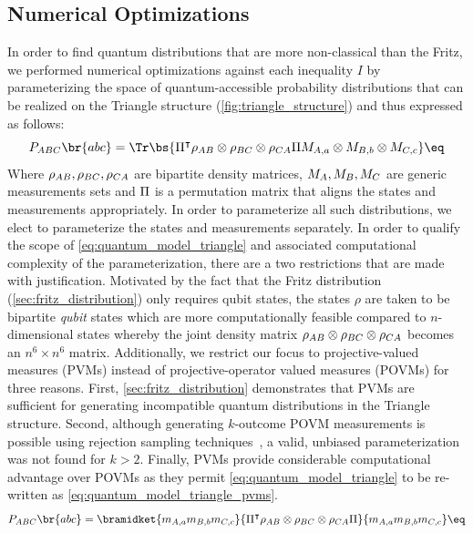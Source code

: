 \documentclass[aps, 10pt, english, twoside, pra, nofootinbib, tightenlines, longbibliography, superscriptaddress]{revtex4-1}
\begin{document}
    \subsection{Numerical Optimizations}
    \label{sec:optimizations}

    In order to find quantum distributions that are more non-classical than the Fritz, we performed numerical optimizations against each inequality $I$ by parameterizing the space of quantum-accessible probability distributions that can be realized on the Triangle structure (\cref{fig:triangle_structure}) and thus expressed as follows:
    \[ \prob[\p{ABC}]\br{abc} = \Tr\bs{\netperm^\intercal \rho_{\p{AB}}\otimes\rho_{\p{BC}}\otimes\rho_{\p{CA}} \netperm M_{\p{A},a}\otimes M_{\p{B},b} \otimes M_{\p{C},c}} \eq \label{eq:quantum_model_triangle}\]
    Where $\rho_{AB}, \rho_{BC}, \rho_{CA}$ are bipartite density matrices, $M_{A}, M_{B}, M_{C}$ are generic measurements sets and $\Pi$ is a permutation matrix that aligns the states and measurements appropriately. In order to parameterize all such distributions, we elect to parameterize the states and measurements separately. In order to qualify the scope of \cref{eq:quantum_model_triangle} and associated computational complexity of the parameterization, there are a two restrictions that are made with justification. Motivated by the fact that the Fritz distribution (\cref{sec:fritz_distribution}) only requires qubit states, the states $\rho$ are taken to be bipartite \textit{qubit} states which are more computationally feasible compared to $n$-dimensional states whereby the joint density matrix $\rho_{AB}\otimes\rho_{BC}\otimes\rho_{CA}$ becomes an $n^6 \times n^6$ matrix. Additionally, we restrict our focus to projective-valued measures (PVMs) instead of projective-operator valued measures (POVMs) for three reasons. First, \cref{sec:fritz_distribution} demonstrates that PVMs are sufficient for generating incompatible quantum distributions in the Triangle structure. Second, although generating $k$-outcome POVM measurements is possible using rejection sampling techniques~\cite{Petz_2015}, a valid, unbiased parameterization was not found for $k > 2$. Finally, PVMs provide considerable computational advantage over POVMs as they permit \cref{eq:quantum_model_triangle} to be re-written as \cref{eq:quantum_model_triangle_pvms}.
    \[ \prob[\p{ABC}]\br{abc} = \bramidket{m_{\p{A},a}m_{\p{B},b}m_{\p{C},c}}{\netperm^\intercal \rho_{AB}\otimes\rho_{BC}\otimes\rho_{CA} \netperm}{m_{\p{A},a}m_{\p{B},b}m_{\p{C},c}} \eq \label{eq:quantum_model_triangle_pvms}\]
\end{document}
